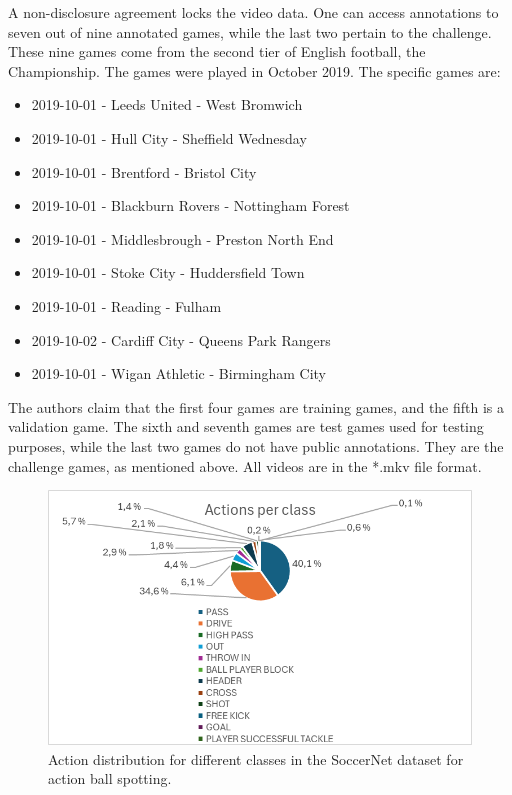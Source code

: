 A non-disclosure agreement locks the video data. One can access annotations to seven out of nine annotated games, while the last two pertain to the challenge. These nine games come from the second tier of English football, the Championship. The games were played in October 2019. The specific games are:

\begin{itemize}
    \item 2019-10-01 - Leeds United - West Bromwich
    \item 2019-10-01 - Hull City - Sheffield Wednesday
    \item 2019-10-01 - Brentford - Bristol City
    \item 2019-10-01 - Blackburn Rovers - Nottingham Forest
    \item 2019-10-01 - Middlesbrough - Preston North End
    \item 2019-10-01 - Stoke City - Huddersfield Town
    \item 2019-10-01 - Reading - Fulham
    \item 2019-10-02 - Cardiff City - Queens Park Rangers
    \item 2019-10-01 - Wigan Athletic - Birmingham City
\end{itemize}

The authors claim that the first four games are training games, and the fifth is a validation game. The sixth and seventh games are test games used for testing purposes, while the last two games do not have public annotations. They are the challenge games, as mentioned above. All videos are in the *.mkv file format. 

\begin{figure}
    \centering
    \includegraphics[width=1\linewidth]{figures/actions_per_class_2.png}
    \caption{Action distribution for different classes in the SoccerNet dataset for action ball spotting. }
    \label{fig:soccernet_dist}
\end{figure}

